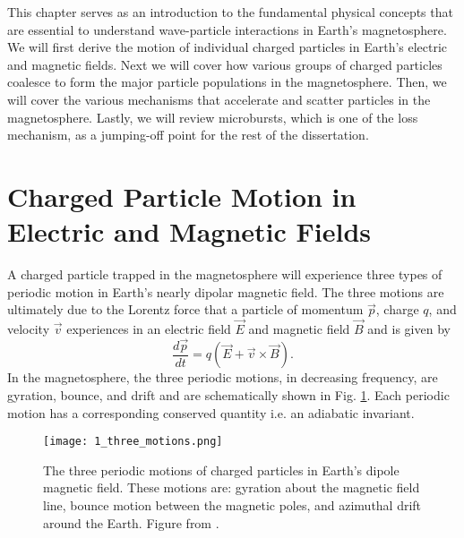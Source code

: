 This chapter serves as an introduction to the fundamental physical concepts that are essential to understand wave-particle interactions in Earth's magnetosphere. We will first derive the motion of individual charged particles in Earth's electric and magnetic fields. Next we will cover how various groups of charged particles coalesce to form the major particle populations in the magnetosphere. Then, we will cover the various mechanisms that accelerate and scatter particles in the magnetosphere. Lastly, we will review microbursts, which is one of the loss mechanism, as a jumping-off point for the rest of the dissertation. 

\section{Charged Particle Motion in Electric and Magnetic Fields}\label{Intro:particle_motion}
A charged particle trapped in the magnetosphere will experience three types of periodic motion in Earth's nearly dipolar magnetic field. The three motions are ultimately due to the Lorentz force that a particle of momentum $\vec{p}$, charge $q$, and velocity $\vec{v}$ experiences in an electric field $\vec{E}$ and magnetic field $\vec{B}$ and is given by
\begin{equation} \label{Intro:Lorentz}
\frac{d\vec{p}}{dt} = q(\vec{E} + \vec{v} \times \vec{B}).
\end{equation} In the magnetosphere, the three periodic motions, in decreasing frequency, are gyration, bounce, and drift and are schematically shown in Fig. \ref{Intro:motion_diagram}. Each periodic motion has a corresponding conserved quantity i.e. an adiabatic invariant. 

\begin{figure}
\texttt{[image: 1\_three\_motions.png]}
\caption{The three periodic motions of charged particles in Earth's dipole magnetic field. These motions are: gyration about the magnetic field line, bounce motion between the magnetic poles, and azimuthal drift around the Earth. Figure from \citep{Baumjohann1997}.}
\label{Intro:motion_diagram}
\end{figure}



